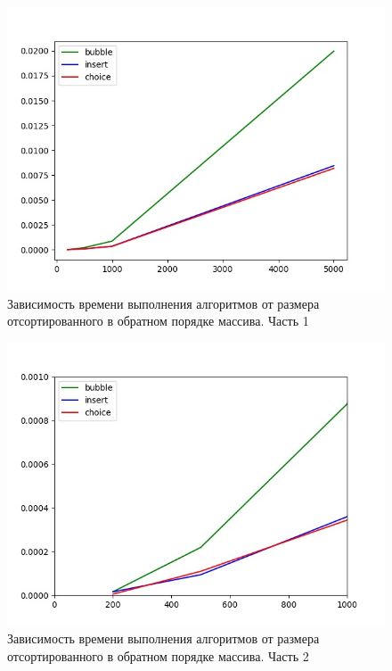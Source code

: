 \documentclass[14pt,russian]{scrartcl}
\begin{document}
   \begin{figure}
    \centering
    \includegraphics[scale=0.7]{reversed_full.jpeg}
    \caption{Зависимость времени выполнения алгоритмов от  размера отсортированного в обратном порядке массива. Часть 1}
    \label{img:reversed_arr_full}
\end{figure}
\begin{figure}
    \centering
    \includegraphics[scale=0.7]{reversed_part.jpeg}
    \caption{Зависимость времени выполнения алгоритмов от  размера отсортированного в обратном порядке массива. Часть 2}
    \label{img:reversed_arr_part}
\end{figure}
\end{document}
